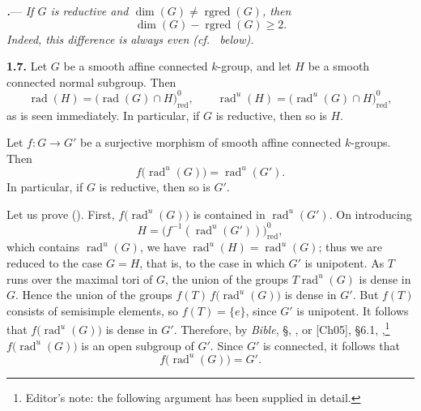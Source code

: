 \par\medskip\noindent
{}\textbf{\textit{.}}---
\textit{If \(G\) is reductive and
\(\dim(G)\ne\operatorname{rgred}(G)\), then
\[
  \dim(G)-\operatorname{rgred}(G)\geq 2.
\]
Indeed, this difference is always even (cf.\  below).}

\par\medskip\noindent{}\textbf{1.7.}\quad
Let \(G\) be a smooth affine connected \(k\)-group, and let \(H\) be a
smooth connected normal subgroup.  Then
\begin{equation}
  \operatorname{rad}(H)
  =
  \bigl(\operatorname{rad}(G)\cap H\bigr)_{\mathrm{red}}^{0},
  \qquad
  \operatorname{rad}^{u}(H)
  =
  \bigl(\operatorname{rad}^{u}(G)\cap H\bigr)_{\mathrm{red}}^{0},
  \tag{1.7.1}
\end{equation}
as is seen immediately.  In particular, if \(G\) is reductive, then so is
\(H\).

Let \(f:G\longrightarrow G'\) be a surjective morphism of smooth affine
connected \(k\)-groups.  Then
\begin{equation}
  f\bigl(\operatorname{rad}^{u}(G)\bigr)
  =
  \operatorname{rad}^{u}(G').
  \tag{1.7.2}
\end{equation}
In particular, if \(G\) is reductive, then so is \(G'\).

Let us prove ().  First,
\(f\bigl(\operatorname{rad}^{u}(G)\bigr)\) is contained in
\(\operatorname{rad}^{u}(G')\).  On introducing
\[
  H=
  \bigl(f^{-1}(\operatorname{rad}^{u}(G'))\bigr)_{\mathrm{red}}^{0},
\]
which contains \(\operatorname{rad}^{u}(G)\), we have
\(\operatorname{rad}^{u}(H)=\operatorname{rad}^{u}(G)\); thus we are reduced
to the case \(G=H\), that is, to the case in which \(G'\) is unipotent.
As \(T\) runs over the maximal tori of \(G\), the union of the groups
\(T\operatorname{rad}^{u}(G)\) is dense in \(G\).  Hence the union of the
groups \(f(T)\,f\bigl(\operatorname{rad}^{u}(G)\bigr)\) is dense in \(G'\).
But \(f(T)\) consists of semisimple elements, so \(f(T)=\{e\}\), since
\(G'\) is unipotent.  It follows that
\(f\bigl(\operatorname{rad}^{u}(G)\bigr)\) is dense in \(G'\).  Therefore,
by \emph{Bible}, §, , or [Ch05], §6.1, ,\footnote{Editor's
note: the following argument has been supplied in detail.}
\(f\bigl(\operatorname{rad}^{u}(G)\bigr)\) is an open subgroup of \(G'\).
Since \(G'\) is connected, it follows that
\[
  f\bigl(\operatorname{rad}^{u}(G)\bigr)=G'.
\]

